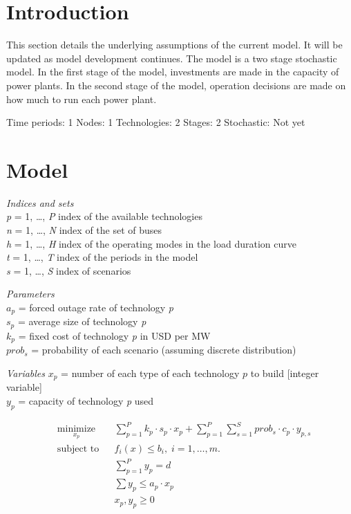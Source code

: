 \documentclass[10pt]{amsart}
\begin{document}
\section{Introduction}
This section details the underlying assumptions of the current model. 
It will be updated as model development continues.
The model is a two stage stochastic model.
In the first stage of the model, investments are made in the capacity of power plants.
In the second stage of the model, operation decisions are made on how much to run each power plant. 

Time periods: 1
Nodes: 1
Technologies: 2
Stages: 2
Stochastic: Not yet

\section{Model}
\begin{flushleft}
\textit{Indices and sets}\\
\textit{p} = 1, \ldots, \textit{P} index of the available technologies \\ 
\textit{n} = 1, \ldots, \textit{N} index of the set of buses \\
\textit{h} = 1, \ldots, \textit{H} index of the operating modes in the load duration curve \\
\textit{t} = 1, \ldots, \textit{T} index of the periods in the model \\
\textit{s} = 1, \ldots, \textit{S} index of scenarios \\
\end{flushleft}

\begin{flushleft}
\textit{Parameters} \\
$a_{p}$ = forced outage rate of technology \textit{p} \\
$s_{p}$ = average size of technology \textit{p} \\
$k_{p}$ = fixed cost of technology \textit{p} in USD per MW \\
$prob_{s}$ = probability of each scenario (assuming discrete distribution) \\
\end{flushleft}

\begin{flushleft}
\textit{Variables}
$x_{p}$ = number of each type of each technology $\textit{p}$ to build [integer variable] \\
$y_{p}$ = capacity of technology \textit{p} used \\
\end{flushleft}

\begin{equation*}
\begin{aligned}
& \underset{x_{p}}{\text{minimize}} & & \sum_{p=1}^{P} k_{p}\cdot s_{p}\cdot x_{p} + \sum_{p=1}^{P} \sum_{s=1}^{S} prob_{s} \cdot c_{p}\cdot y_{p,s} \\
& \text{subject to} & & f_i(x) \leq b_i, \; i = 1, \ldots, m. \\
& &&\sum_{p=1}^{P} y_{p} = d \\
& &&\sum y_{p} \leq a_{p}\cdot x_{p} \\
& && x_{p}, y_{p} \geq 0
\end{aligned}
\end{equation*}
\end{document}
